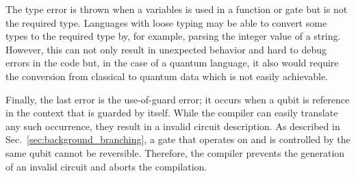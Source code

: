 The type error is thrown when a variables is used in a function or gate but is not the required type. Languages with loose typing may be able to convert some types to the required type by, for example, parsing the integer value of a string. However, this can not only result in unexpected behavior and hard to debug errors in the code but, in the case of a quantum language, it also would require the conversion from classical to quantum data which is not easily achievable.

Finally, the last error is the use-of-guard error; it occurs when a qubit is reference in the context that is guarded by itself. While the compiler can easily translate any such occurrence, they result in a invalid circuit description. As described in Sec.~\ref{sec:background_branching}, a gate that operates on and is controlled by the same qubit cannot be reversible. Therefore, the compiler prevents the generation of an invalid circuit and aborts the compilation. 